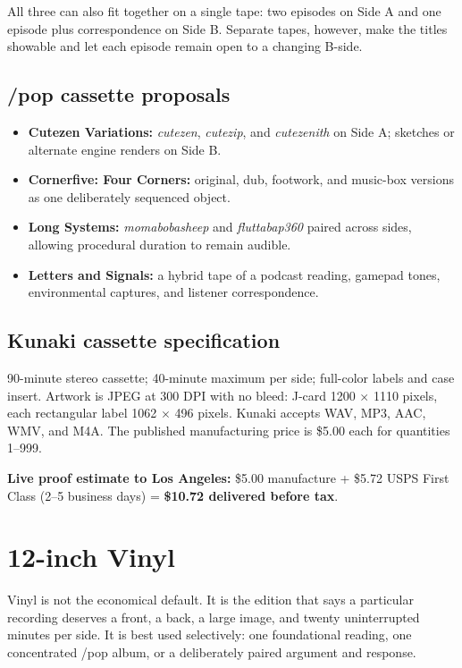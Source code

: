\documentclass[11pt]{article}
\newcommand{\mediumtitle}[1]{\section*{\Huge\color{acpink}#1}}
\begin{document}
All three can also fit together on a single tape: two episodes on Side A and one episode plus correspondence on Side B. Separate tapes, however, make the titles showable and let each episode remain open to a changing B-side.

\subsection*{/pop cassette proposals}

\begin{itemize}
  \item \textbf{Cutezen Variations:} \textit{cutezen}, \textit{cutezip}, and \textit{cutezenith} on Side A; sketches or alternate engine renders on Side B.
  \item \textbf{Cornerfive: Four Corners:} original, dub, footwork, and music-box versions as one deliberately sequenced object.
  \item \textbf{Long Systems:} \textit{momabobasheep} and \textit{fluttabap360} paired across sides, allowing procedural duration to remain audible.
  \item \textbf{Letters and Signals:} a hybrid tape of a podcast reading, gamepad tones, environmental captures, and listener correspondence.
\end{itemize}

\subsection*{Kunaki cassette specification}

90-minute stereo cassette; 40-minute maximum per side; full-color labels and case insert. Artwork is JPEG at 300 DPI with no bleed: J-card 1200 $\times$ 1110 pixels, each rectangular label 1062 $\times$ 496 pixels. Kunaki accepts WAV, MP3, AAC, WMV, and M4A. The published manufacturing price is \$5.00 each for quantities 1--999.

\textbf{Live proof estimate to Los Angeles:} \$5.00 manufacture + \$5.72 USPS First Class (2--5 business days) = \textbf{\$10.72 delivered before tax}.

\clearpage
\mediumtitle{12-inch Vinyl}

Vinyl is not the economical default. It is the edition that says a particular recording deserves a front, a back, a large image, and twenty uninterrupted minutes per side. It is best used selectively: one foundational reading, one concentrated /pop album, or a deliberately paired argument and response.
\end{document}
